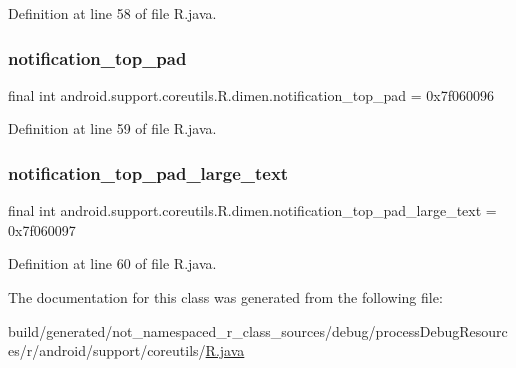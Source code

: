 Definition at line 58 of file R.\+java.

\mbox{\label{classandroid_1_1support_1_1coreutils_1_1_r_1_1dimen_a4589b9bdbd19c78d9e8a4db2427f9774}} 
\subsubsection{\texorpdfstring{notification\_top\_pad}{notification\_top\_pad}}
{\footnotesize\ttfamily final int android.\+support.\+coreutils.\+R.\+dimen.\+notification\+\_\+top\+\_\+pad = 0x7f060096\hspace{0.3cm}{\ttfamily [static]}}



Definition at line 59 of file R.\+java.

\mbox{\label{classandroid_1_1support_1_1coreutils_1_1_r_1_1dimen_a2f62bb1b0cacaa1abbf10abacf232a24}} 
\subsubsection{\texorpdfstring{notification\_top\_pad\_large\_text}{notification\_top\_pad\_large\_text}}
{\footnotesize\ttfamily final int android.\+support.\+coreutils.\+R.\+dimen.\+notification\+\_\+top\+\_\+pad\+\_\+large\+\_\+text = 0x7f060097\hspace{0.3cm}{\ttfamily [static]}}



Definition at line 60 of file R.\+java.



The documentation for this class was generated from the following file\+:\begin{DoxyCompactItemize}
\item 
build/generated/not\+\_\+namespaced\+\_\+r\+\_\+class\+\_\+sources/debug/process\+Debug\+Resources/r/android/support/coreutils/\mbox{\hyperlink{android_2support_2coreutils_2_r_8java}{R.\+java}}\end{DoxyCompactItemize}
